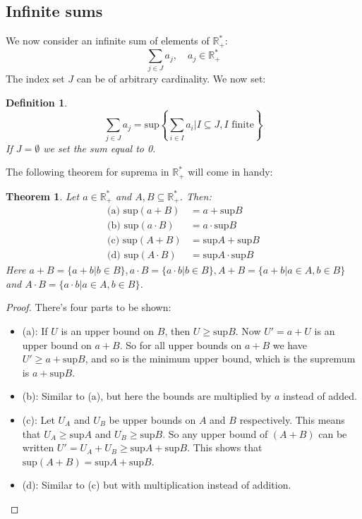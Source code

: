 \documentclass[12pt, a4paper]{article}
\newtheorem{theorem}{Theorem}[section]
\newtheorem{definition}{Definition}[section]
\numberwithin{equation}{section}
\begin{document}
\subsection{Infinite sums}
We now consider an infinite sum of elements of $\mathbb{R}_+^*$:
\begin{equation}
\sum_{j\in J}a_j,\quad a_j\in\mathbb{R}_+^*
\end{equation}
The index set $J$ can be of arbitrary cardinality. We now set:
\begin{definition}
\begin{equation}
\sum_{j\in J}a_j=\textrm{sup}\left\{\sum_{i\in I}a_i|I\subseteq J, I\textrm{ finite}\right\}
\end{equation}
If $J=\emptyset$ we set the sum equal to 0.
\end{definition}
The following theorem for suprema in $\mathbb{R}_+^*$ will come in handy:

\begin{theorem}
\label{suprema_sets}
Let $a\in\mathbb{R}_+^*$ and $A,B\subseteq\mathbb{R}_+^*$. Then:
\begin{align}
\textrm{(a) sup}(a+B)&=a+\textrm{sup}B\\
\textrm{(b) sup}(a\cdot B)&=a\cdot\textrm{sup}B\\
\textrm{(c) sup}(A+B)&=\textrm{sup}A+\textrm{sup}B\\
\textrm{(d) sup}(A\cdot B)&=\textrm{sup}A\cdot\textrm{sup}B
\end{align}
Here $a+B=\{a+b|b\in B\}, a\cdot B=\{a\cdot b|b\in B\}, A+B=\{a+b|a\in A, b\in B\}$ and $A\cdot B=\{a\cdot b|a\in A, b\in B\}$.
\end{theorem}
\begin{proof}
There's four parts to be shown:
\begin{itemize}
\item (a): If $U$ is an upper bound on $B$, then $U\ge\textrm{sup}B$. Now $U'=a+U$ is an upper bound on $a+B$. So for all upper bounds on $a+B$ we have $U'\ge a+\textrm{sup}B$, and so is the minimum upper bound, which is the supremum is $a+\textrm{sup}B$.
\item (b): Similar to (a), but here the bounds are multiplied by $a$ instead of added.
\item (c): Let $U_A$ and $U_B$ be upper bounds on $A$ and $B$ respectively. This means that $U_A\ge\textrm{sup}A$ and $U_B\ge\textrm{sup}B$. So any upper bound of $(A+B)$ can be written $U'=U_A+U_B\ge\textrm{sup}A+\textrm{sup}B$. This shows that $\textrm{sup}(A+B)=\textrm{sup}A+\textrm{sup}B$.
\item (d): Similar to (c) but with multiplication instead of addition.
\end{itemize}
\end{proof}
\end{document}
